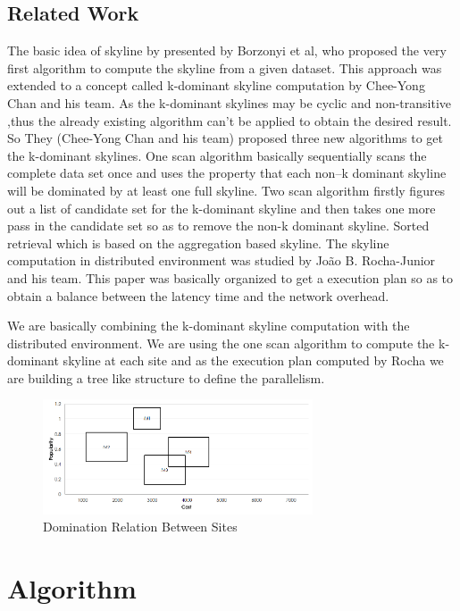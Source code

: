 \documentclass[twocolumn]{article}
\begin{document}
\subsection{Related Work}
\label{relatedwork}
The basic idea of skyline by presented by Borzonyi et al, who proposed the very first algorithm to compute the skyline from a given dataset. This approach was extended to a concept called k-dominant skyline computation by Chee-Yong Chan\cite{Chan:2006:FKS:1142473.1142530} and his team. As the k-dominant skylines may be cyclic and non-transitive ,thus the already existing algorithm can’t be applied to obtain the desired result. So  They (Chee-Yong Chan and his team) proposed three new algorithms to get the k-dominant skylines. One scan algorithm \cite{Chan:2006:FKS:1142473.1142530} basically sequentially scans the complete data set once and uses the property that each non–k dominant skyline will be dominated by at least one full skyline. Two scan algorithm \cite{Chan:2006:FKS:1142473.1142530}firstly figures out a list of candidate set for the k-dominant skyline and then takes one more pass in the candidate set so as to remove the non-k dominant skyline. Sorted retrieval \cite{Chan:2006:FKS:1142473.1142530}which is based on the aggregation based skyline.
The skyline computation in distributed environment was studied by João B. Rocha-Junior and his team\cite{Rocha-Junior:2011:EEP:1951365.1951399}. This paper was basically organized to get a execution plan so as to obtain a balance between the latency time and the network overhead.

We are basically combining the k-dominant skyline computation with the distributed environment. We are using the one scan algorithm to compute the k-dominant skyline at each site and as the execution plan computed by Rocha we are building a tree like structure to define the parallelism.

\begin{figure}[htp]
\centering
\includegraphics[width=8cm]{mbr}
\caption{Domination Relation Between Sites}
\label{fig:mbr}
\end{figure}



\section{Algorithm}
\label{algorithm}
\end{document}

